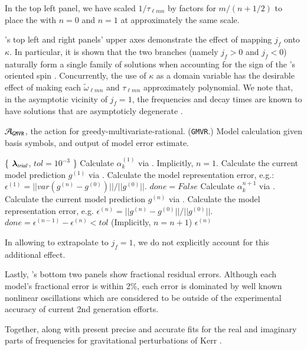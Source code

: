 \documentclass[twocolumn,aps,prd,floatfix,preprintnumbers,a4paper,nofootinbib,
superscriptaddress,10pt]{revtex4-1}
\newcommand{\cw}{\tilde{\omega}}
\def\jf{j_f}
\def\lmn{_{\ell m n}}
\def\gmvr#1{greedy-multivariate-rational#1
  (\texttt{GMVR}#1)\gdef\gmvr{\texttt{GMVR}}}
\begin{document}
%
In the top left panel, we have scaled $1/\tau\lmn$ by factors for $m/(n+1/2)$ to place the  with $n=0$ and $n=1$ at approximately the same scale.
%
\begin{widetext}
	
\end{widetext}
%
\par {}'s top left and right panels' upper axes demonstrate the effect of mapping $\jf$ onto $\kappa$.
%
In particular, it is shown that the two branches (namely $\jf>0$ and $\jf<0$) naturally form a single family of solutions when accounting for the sign of the \bh{}'s oriented spin \cite{Husa:2007hp}.
%
Concurrently, the use of $\kappa$ as a domain variable has the desirable effect of making each $\cw\lmn$ and $\tau\lmn$ approximately polynomial.
%
We note that, in the asymptotic vicinity of $\jf=1$, the \qnm{} frequencies and decay times are known to have solutions that are asymptoticly degenerate \cite{Zimmerman:2015rua}.
%
{\scriptsize
\begin{algorithm}[H]
  \caption{$\mathcal{A}_{\gmvr}$, the action for \gmvr. Model calculation given basis symbols, and output of model error estimate.}
  \label{alg:A_gmvr}
  \begin{algorithmic}[1]
     \{ ${\bm{\lambda}}_{trial}$, $tol=10^{-3}$ \}
    \vskip 10pt
    \State Calculate $\alpha^{(1)}_k$ via . Implicitly, $n=1$.
    \State Calculate the current model prediction $g^{(1)}$ via .
    \State Calculate the model representation error, e.g.: $\epsilon^{(1)}  = ||var(g^{(n)} - g^{(0)})||/||g^{(0)}||$.
    \State $done = False$
      \State Calculate $\alpha^{n+1}_{k}$  via .
      \State Calculate the current model prediction $g^{(n)}$ via .
      \State Calculate the model representation error, e.g. $\epsilon^{(n)} = ||g^{(n)} - g^{(0)}||/||g^{(0)}||$.
      \State $done = \epsilon^{(n-1)}-\epsilon^{(n)} < tol$
      \State (Implicitly, $n = n+1$)
    \EndWhile
    \vskip 10pt
     $\epsilon^{(n)}$
  \end{algorithmic}
\end{algorithm}
}
%
In allowing  to extrapolate to $\jf=1$, we do not explicitly account for this additional effect.
%
\par Lastly, 's bottom two panels show fractional residual errors.
%
Although each model's fractional error is within 2\%, each error is dominated by well known nonlinear oscillations which are considered to be outside of the experimental accuracy of current 2nd generation \gw{} efforts.
%
\par Together,  along with  present precise and accurate fits for the real and imaginary parts of \qnm{} frequencies for gravitational perturbations of Kerr .
%
%
\end{document}
